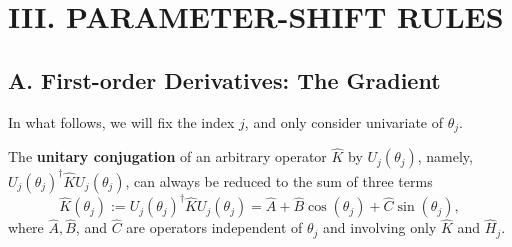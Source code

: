 \section{III. PARAMETER-SHIFT RULES}

\subsection{A. First-order Derivatives: The Gradient}

In what follows, we will fix the index $j$, and only consider univariate of $\theta_j$.

\begin{lemma}
    The \textbf{unitary conjugation} of an arbitrary operator $\hat{K}$ by $U_j\left(\theta_j\right)$, namely, $U_j\left(\theta_j\right)^{\dagger} \hat{K} U_j\left(\theta_j\right)$, can always be reduced to the sum of three terms
\begin{equation}
    \hat{K}\left(\theta_j\right):=U_j\left(\theta_j\right)^{\dagger} \hat{K} U_j\left(\theta_j\right)=\hat{A}+\hat{B} \cos \left(\theta_j\right)+\hat{C} \sin \left(\theta_j\right),
\end{equation}
where $\hat{A}, \hat{B}$, and $\hat{C}$ are operators independent of $\theta_j$ and involving only $\hat{K}$ and $\hat{H}_j$.
\end{lemma}

